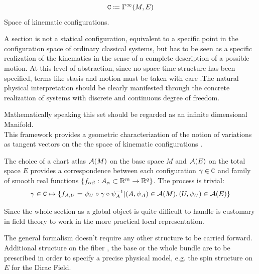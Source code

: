 \documentclass[Main]{subfiles}
\begin{document}
	\begin{notationfix}
		\begin{displaymath}
			\mathtt{C} \coloneqq \Gamma^\infty(M,E)
		\end{displaymath}
		Space of kinematic configurations.
	\end{notationfix}

	A section is not a statical configuration, equivalent to a specific point in the configuration space of ordinary classical systems, but has to be seen as a specific realization of the kinematics in the sense of  a complete description of a possible motion.
	At this level of abstraction, since no space-time structure has been specified, terms like stasis and motion must be taken with care .The natural physical interpretation should be clearly manifested through the concrete realization of systems with discrete and continuous degree of freedom.
	
	\begin{observation}
	Mathematically speaking this set should be regarded as an infinite dimensional Manifold. 
	\\
	This framework provides a geometric characterization of the notion of variations as tangent vectors on the the space of kinematic configurations .\cite{Forger2005}
	\end{observation}
	
	\begin{observation}
	The choice of a chart atlas $\mathcal{A}(M)$ on the base space $M$ and $\mathcal{A}(E)$ on the total space $E$ provides a correspondence between each configuration $\gamma \in \mathtt{C}$ and family of smooth real functions $\{f_{\alpha \beta}:A_\alpha \subset \mathbb{R}^m \rightarrow \mathbb{R}^q \}$.
	The process is trivial:
	\begin{displaymath}
		\gamma \in \mathtt{C} \mapsto \{f_{A,U}=\psi_U \circ \gamma \circ \psi_A^{-1} \vert (A,\psi_A) \in \mathcal{A}(M), (U,\psi_U)\in \mathcal{A}(E)   \}
	\end{displaymath}
	

	Since the whole section as a global object is quite difficult to handle is customary in field theory to work in the more practical local representation. 
	\end{observation}	
	
	\begin{observation}
	 	The general formalism doesn't require any other structure to be carried forward.
	 	Additional structure on the fiber , the base or the whole bundle are to be prescribed in order to specify a precise physical model, e.g. the spin structure on $E$ for the Dirac Field.\cite{Benini}
	 \end{observation}	
	
\end{document}
